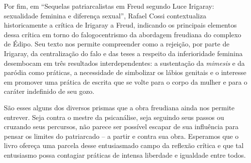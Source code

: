 Por fim, em ``Sequelas patriarcalistas em Freud segundo Luce Irigaray:
sexualidade feminina e diferença sexual'', Rafael Cossi contextualiza
historicamente a crítica de Irigaray a Freud, indicando os principais
elementos dessa crítica em torno do falogocentrismo da abordagem
freudiana do complexo de Édipo. Seu texto nos permite compreender como a
rejeição, por parte de Irigaray, da centralização do falo e das teses a
respeito da inferioridade feminina desembocam em três resultados
interdependentes: a sustentação da \emph{mimesis} e da paródia como
práticas, a necessidade de simbolizar os lábios genitais e o interesse
em promover uma prática de escrita que se volte para o corpo da mulher e
para o caráter indefinido de seu gozo.

São esses alguns dos diversos prismas que a obra freudiana ainda nos
permite entrever. Seja contra o mestre da psicanálise, seja seguindo
seus passos ou cruzando seus percursos, não parece ser possível escapar
de sua influência para pensar os limites do patriarcado -- a partir e
contra sua obra. Esperamos que o livro ofereça uma parcela desse
entusiasmado campo da reflexão crítica e que tal entusiasmo possa
contagiar práticas de intensa liberdade e igualdade entre todos.
